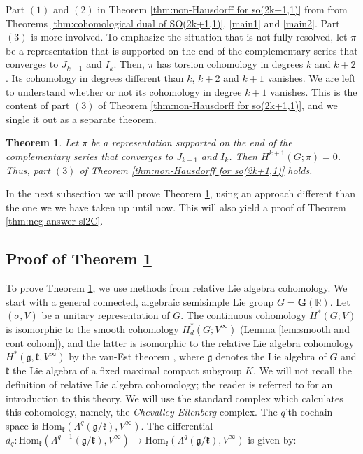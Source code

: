 \documentclass[12pt,reqno]{amsart}
\newcommand{\R}{\mathbb{R}}
\newtheorem{theorem}{Theorem}[section]
\theoremstyle{definition}
\begin{document}
Part $(1)$ and $(2)$ in Theorem \ref{thm:non-Hausdorff for so(2k+1,1)} from from Theorems \ref{thm:cohomological dual of SO(2k+1,1)}, \ref{main1} and \ref{main2}. Part $(3)$ is more involved. To emphasize the situation that is not fully resolved, let $\pi$ be a representation that is supported on the end of the complementary series that converges to $J_{k-1}$ and $I_k$. Then, $\pi$ has torsion cohomology in degrees $k$ and $k+2$. Its cohomology in degrees different than $k$, $k+2$ and $k+1$ vanishes. We are left to understand whether or not its cohomology in degree $k+1$ vanishes. This is the content of part $(3)$ of Theorem \ref{thm:non-Hausdorff for so(2k+1,1)}, and we single it out as a separate theorem.
\begin{theorem}\label{greatQuestion}
    Let $\pi$ be a representation supported on the end of the complementary series that converges to $J_{k-1}$ and $I_k$. Then $H^{k+1}(G;\pi) = 0$. Thus, part $(3)$ of Theorem \ref{thm:non-Hausdorff for so(2k+1,1)} holds.
\end{theorem}
In the next subsection we will prove Theorem \ref{greatQuestion}, using an approach different than the one we we have taken up until now. This will also yield a proof of Theorem \ref{thm:neg answer sl2C}.
\subsection{Proof of Theorem \ref{greatQuestion}}\label{subsec:6.4}
To prove Theorem \ref{greatQuestion}, we use methods from relative Lie algebra cohomology. We start with a general connected, algebraic semisimple Lie group $G=\mathbf{G}(\R)$. Let $(\sigma,V)$ be a unitary representation of $G$. The continuous cohomology  $H^*(G;V)$ is isomorphic to the smooth cohomology $H^*_d(G;V^\infty)$ (Lemma \ref{lem:smooth and cont cohom}), and the latter is isomorphic to the relative Lie algebra cohomology $H^*(\mathfrak{g},\mathfrak{k},V^\infty)$ by the van-Est theorem \cite[Theorem~3.2]{Kyed}, where $\mathfrak{g}$ denotes the Lie algebra of $G$ and $\mathfrak{k}$ the Lie algebra of a fixed maximal compact subgroup $K$. We will not recall the definition of relative Lie algebra cohomology; the reader is referred to \cite[Chapter~I]{BorelWallach} for an introduction to this theory. We will use the standard complex which calculates this cohomology, namely, the \textit{Chevalley-Eilenberg} complex. The $q$'th cochain space is $\mathrm{Hom}_\mathfrak{k}(\Lambda^q (\mathfrak{g}/\mathfrak{k}), V^{\infty})$. The  differential $d_q: \mathrm{Hom}_\mathfrak{k}(\Lambda^{q-1} (\mathfrak{g}/\mathfrak{k}), V^{\infty}) \to \mathrm{Hom}_\mathfrak{k}(\Lambda^q (\mathfrak{g}/\mathfrak{k}), V^{\infty})$ is given by:
\end{document}
